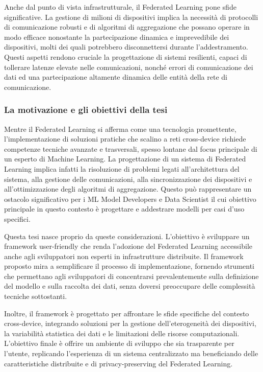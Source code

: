 \documentclass[a4paper, oneside, openright]{report}
\begin{document}
Anche dal punto di vista infrastrutturale, il Federated Learning pone sfide significative. La gestione di milioni di dispositivi implica la necessità di protocolli di comunicazione robusti e di algoritmi di aggregazione che possano operare in modo efficace nonostante la partecipazione dinamica e imprevedibile dei dispositivi, molti dei quali potrebbero disconnettersi durante l'addestramento. Questi aspetti rendono cruciale la progettazione di sistemi resilienti, capaci di tollerare latenze elevate nelle comunicazioni, nonché errori di comunicazione dei dati ed una partecipazione altamente dinamica delle entità della rete di comunicazione.

\subsubsection*{La motivazione e gli obiettivi della tesi}
Mentre il Federated Learning si afferma come una tecnologia promettente, l'implementazione di soluzioni pratiche che scalino a reti cross-device richiede competenze tecniche avanzate e trasversali, spesso lontane dal focus principale di un esperto di Machine Learning. La progettazione di un sistema di Federated Learning implica infatti la risoluzione di problemi legati all'architettura del sistema, alla gestione delle comunicazioni, alla sincronizzazione dei dispositivi e all’ottimizzazione degli algoritmi di aggregazione. Questo può rappresentare un ostacolo significativo per i ML Model Developers e Data Scientist il cui obiettivo principale in questo contesto è progettare e addestrare modelli per casi d'uso specifici.

Questa tesi nasce proprio da queste considerazioni. L'obiettivo è sviluppare un framework user-friendly che renda l'adozione del Federated Learning accessibile anche agli sviluppatori non esperti in infrastrutture distribuite. Il framework proposto mira a semplificare il processo di implementazione, fornendo strumenti che permettano agli sviluppatori di concentrarsi prevalentemente sulla definizione del modello e sulla raccolta dei dati, senza doversi preoccupare delle complessità tecniche sottostanti.

Inoltre, il framework è progettato per affrontare le sfide specifiche del contesto cross-device, integrando soluzioni per la gestione dell'eterogeneità dei dispositivi, la variabilità statistica dei dati e le limitazioni delle risorse computazionali. L'obiettivo finale è offrire un ambiente di sviluppo che sia trasparente per l'utente, replicando l'esperienza di un sistema centralizzato ma beneficiando delle caratteristiche distribuite e di privacy-preserving del Federated Learning.
\end{document}
